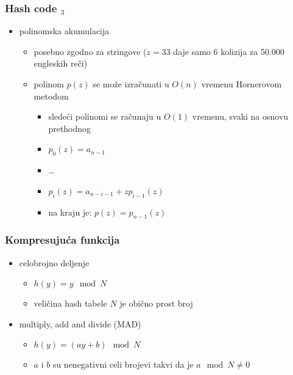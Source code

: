 \documentclass[compress]{beamer}
\begin{document}
\begin{frame}[fragile]
  \frametitle{Hash code $_3$}
  \begin{itemize}
    \item polinomska akumulacija
    \begin{itemize}
      \item posebno zgodno za stringove ($z=33$ daje samo 6 kolizija za 50.000 engleskih reči)
      \item polinom $p(z)$ se može izračunati u $O(n)$ vremenu Hornerovom metodom
      \begin{itemize}
        \item sledeći polinomi se računaju u $O(1)$ vremenu, svaki na osnovu prethodnog
        \item $p_0(z) = a_{n-1}$
        \item \ldots
        \item $p_i(z) = a_{n-i-1} + zp_{i-1}(z)$
        \item na kraju je: $p(z) = p_{n-1}(z)$
      \end{itemize}
    \end{itemize}
  \end{itemize}
\end{frame}

\begin{frame}[fragile]
  \frametitle{Kompresujuća funkcija}
  \begin{itemize}
    \item celobrojno deljenje
    \begin{itemize}
      \item $h(y) = y \mod N$
      \item veličina hash tabele $N$ je obično prost broj
    \end{itemize}
    \item multiply, add and divide (MAD)
    \begin{itemize}
      \item $h(y) = (ay+b) \mod N$
      \item $a$ i $b$ su nenegativni celi brojevi takvi da je $a\mod N \neq 0$
    \end{itemize}
  \end{itemize}
\end{frame}
\end{document}
